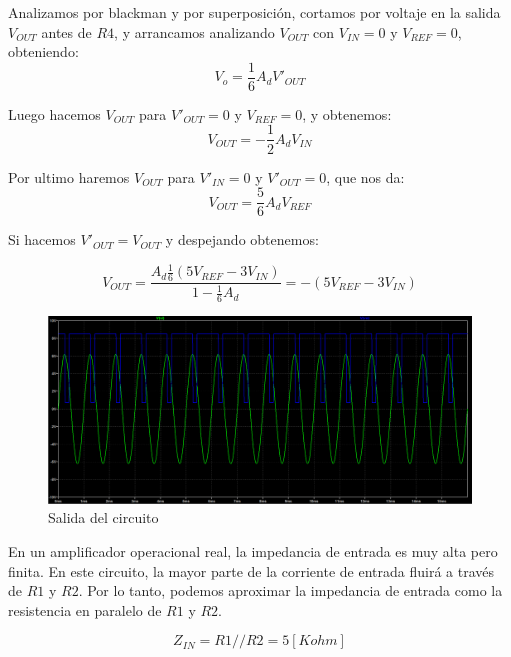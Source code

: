 \documentclass[12pt]{article}
\begin{document}
	Analizamos por blackman y por superposición, cortamos por voltaje en la salida $V_{OUT}$ antes de $R4$, y arrancamos analizando $V_{OUT}$ con $V_{IN} = 0$ y $V_{REF} = 0$, obteniendo:
	\begin{equation}
		V_{o} = \frac{1}{6} A_{d} V'_{OUT}
	\end{equation}
	
	Luego hacemos $V_{OUT}$ para $V'_{OUT} = 0$ y $V_{REF} = 0$, y obtenemos:
	\begin{equation}
		V_{OUT} = -\frac{1}{2} A_{d} V_{IN}
	\end{equation}

	Por ultimo haremos $V_{OUT}$ para $V'_{IN} = 0$ y $V'_{OUT} = 0$, que nos da:
	\begin{equation}
		V_{OUT} = \frac{5}{6} A_{d} V_{REF}
	\end{equation}

	Si hacemos $V'_{OUT} = V_{OUT}$ y despejando obtenemos:

	\begin{equation}
		V_{OUT} = \frac{A_{d} \frac{1}{6} (5 V_{REF} - 3 V_{IN})}{1 - \frac{1}{6} A_{d}} = - (5 V_{REF} - 3V_{IN})
	\end{equation}
	
	\begin{figure}[]
		\includegraphics[width=1\linewidth]{Simulaciones-Resultados/Circuito4_Vo(Vi)}
		\caption[Salida del circuito]{Salida del circuito}
		\label{fig:circuito4vovi}
	\end{figure}
	En un amplificador operacional real, la impedancia de entrada es muy alta pero finita. En este circuito, la mayor parte de la corriente de entrada fluirá a través de $R1$ y $R2$. Por lo tanto, podemos aproximar la impedancia de entrada como la resistencia en paralelo de $R1$ y $R2$.
	
	\begin{equation}
		Z_{IN}=R1//R2=5[Kohm]
	\end{equation}
\end{document}

